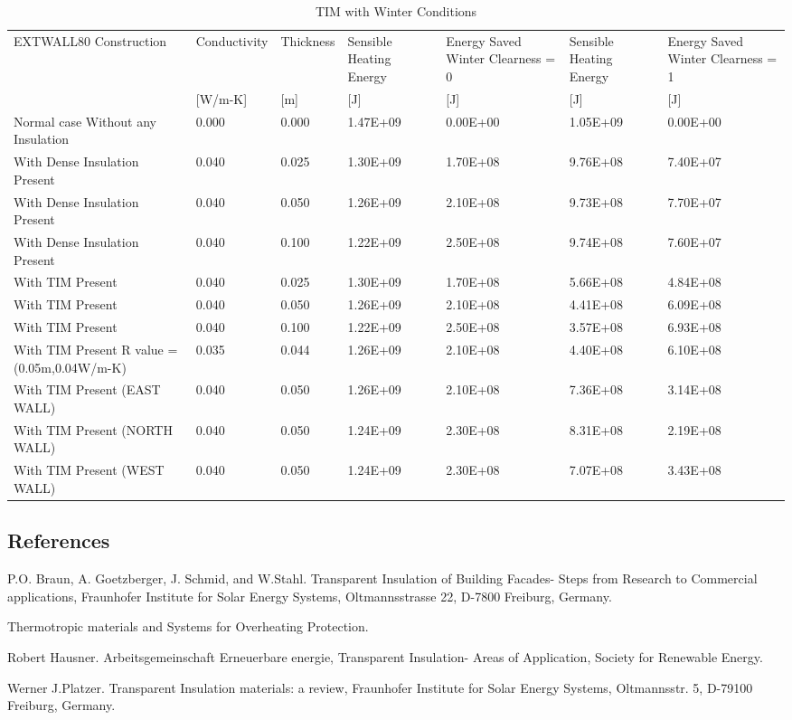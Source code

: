 \begin{longtable}[c]{p{1.5in}p{0.75in}p{0.75in}p{0.75in}p{0.75in}p{0.75in}p{0.75in}}
\caption{TIM with Winter Conditions \label{table:tim-with-winter-conditions}}\\
\toprule 
EXTWALL80 Construction & Conductivity & Thickness & Sensible Heating Energy & Energy Saved Winter Clearness = 0 & Sensible Heating Energy & Energy Saved Winter Clearness = 1 \tabularnewline
~ & [W/m-K] & [m] & [J] & [J] & [J] & [J] \tabularnewline
\midrule
\endhead
Normal case Without any Insulation & 0.000 & 0.000 & 1.47E+09 & 0.00E+00 & 1.05E+09 & 0.00E+00 \tabularnewline
With Dense Insulation Present & 0.040 & 0.025 & 1.30E+09 & 1.70E+08 & 9.76E+08 & 7.40E+07 \tabularnewline
With Dense Insulation Present & 0.040 & 0.050 & 1.26E+09 & 2.10E+08 & 9.73E+08 & 7.70E+07 \tabularnewline
With Dense Insulation Present & 0.040 & 0.100 & 1.22E+09 & 2.50E+08 & 9.74E+08 & 7.60E+07 \tabularnewline
With TIM Present & 0.040 & 0.025 & 1.30E+09 & 1.70E+08 & 5.66E+08 & 4.84E+08 \tabularnewline
With TIM Present & 0.040 & 0.050 & 1.26E+09 & 2.10E+08 & 4.41E+08 & 6.09E+08 \tabularnewline
With TIM Present & 0.040 & 0.100 & 1.22E+09 & 2.50E+08 & 3.57E+08 & 6.93E+08 \tabularnewline
With TIM Present R value = (0.05m,0.04W/m-K) & 0.035 & 0.044 & 1.26E+09 & 2.10E+08 & 4.40E+08 & 6.10E+08 \tabularnewline
With TIM Present (EAST WALL) & 0.040 & 0.050 & 1.26E+09 & 2.10E+08 & 7.36E+08 & 3.14E+08 \tabularnewline
With TIM Present (NORTH WALL) & 0.040 & 0.050 & 1.24E+09 & 2.30E+08 & 8.31E+08 & 2.19E+08 \tabularnewline
With TIM Present (WEST WALL) & 0.040 & 0.050 & 1.24E+09 & 2.30E+08 & 7.07E+08 & 3.43E+08 \tabularnewline
\bottomrule
\end{longtable}

\subsection{References}\label{references-046}

P.O. Braun, A. Goetzberger, J. Schmid, and W.Stahl. Transparent Insulation of Building Facades- Steps from Research to Commercial applications, Fraunhofer Institute for Solar Energy Systems, Oltmannsstrasse 22, D-7800 Freiburg, Germany.

Thermotropic materials and Systems for Overheating Protection.

Robert Hausner. Arbeitsgemeinschaft Erneuerbare energie, Transparent Insulation- Areas of Application, Society for Renewable Energy.

Werner J.Platzer. Transparent Insulation materials: a review, Fraunhofer Institute for Solar Energy Systems, Oltmannsstr. 5, D-79100 Freiburg, Germany.

